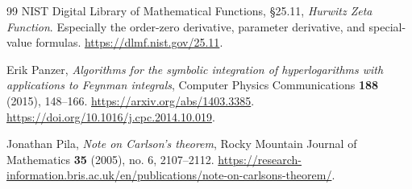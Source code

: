 \begin{thebibliography}{99}
NIST Digital Library of Mathematical Functions, \S25.11,
\emph{Hurwitz Zeta Function}. Especially the order-zero derivative,
parameter derivative, and special-value formulas.
\url{https://dlmf.nist.gov/25.11}.

Erik Panzer, \emph{Algorithms for the symbolic integration of
hyperlogarithms with applications to Feynman integrals},
Computer Physics Communications \textbf{188} (2015), 148--166.
\url{https://arxiv.org/abs/1403.3385}.
\url{https://doi.org/10.1016/j.cpc.2014.10.019}.

Jonathan Pila, \emph{Note on Carlson's theorem},
Rocky Mountain Journal of Mathematics \textbf{35} (2005), no. 6,
2107--2112.
\url{https://research-information.bris.ac.uk/en/publications/note-on-carlsons-theorem/}.

\end{thebibliography}
